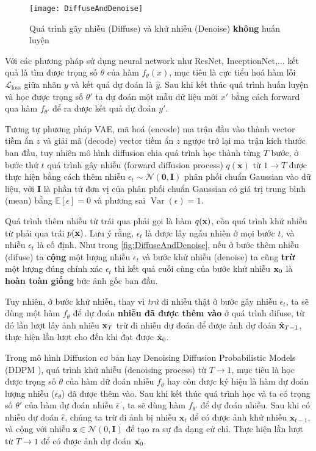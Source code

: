 \begin{figure}[H]
	\centering
	\texttt{[image: DiffuseAndDenoise]}
	\caption{Quá trình gây nhiễu (Diffuse) và khử nhiễu (Denoise) \textbf{không} huấn luyện}
	\label{fig:DiffuseAndDenoise}
\end{figure}

Với các phương pháp sử dụng neural network như ResNet, InceptionNet,... kết quả là tìm được trọng số $\theta$ của hàm $f_{\theta}(x)$, mục tiêu là cực tiểu hoá hàm lỗi $\mathcal{L}_\text{loss}$ giữa nhãn $y$ và kết quả dự đoán là $\hat{y}$. Sau khi kết thúc quá trình huấn luyện và học được trọng số $\theta'$ ta dự đoán một mẫu dữ liệu mới $x'$ bằng cách forward qua hàm $f_{\theta'}$ để ra được kết quả dự đoán $y'$.

Tương tự phương pháp VAE, mã hoá (encode) ma trận đầu vào thành vector tiềm ẩn $z$ và giải mã (decode) vector tiềm ẩn $z$ ngược trở lại ma trận kích thước ban đầu, tuy nhiên mô hình diffusion chia quá trình học thành từng $T$ bước, ở bước thứ $t$ quá trình gây nhiễu (forward diffusion process) $q(\mathbf{x})$ từ $1 \to T$ được thực hiện bằng cách thêm nhiễu $\epsilon_{t} \sim \mathcal{N} (\mathbf{0}, \mathbf{I})$ phân phối chuẩn Gaussian vào dữ liệu, với $\mathbf{I}$ là phần tử đơn vị của phân phối chuẩn Gaussian có giá trị trung bình  (mean) bằng $\mathbb{E}[\epsilon]=0$ và phương sai $\operatorname{Var}(\epsilon)=1$.


Quá trình thêm nhiễu từ trái qua phải gọi là hàm $q(\mathbf{x})$, còn quá trình khử nhiễu từ phải qua trái $p(\mathbf{x})$. Lưu ý rằng, $\epsilon_t$ là được lấy ngẫu nhiên ở mọi bước $t$, và nhiễu $\epsilon_t$ là cố định. Như trong \autoref{fig:DiffuseAndDenoise}, nếu ở bước thêm nhiễu (difuse) ta \textbf{cộng} một lượng nhiễu $\epsilon_t$ và bước khử nhiễu (denoise) ta cũng \textbf{trừ} một lượng đúng chính xác $\epsilon_t$ thì kết quả cuối cùng của bước khử nhiễu $\mathbf{x}_0$ là \textbf{hoàn toàn giống} bức ảnh gốc ban đầu.

Tuy nhiên, ở bước khử nhiễu, thay vì \textit{trừ} đi nhiễu thật ở bước gây nhiễu $\epsilon_t$, ta sẽ dùng một hàm $f_{\theta}$ để dự đoán \textbf{nhiễu đã được thêm vào} ở quá trình difuse, từ đó lần lượt lấy ảnh nhiễu $\mathbf{x}_T$ trừ đi nhiễu dự đoán để được ảnh dự đoán $\hat{\mathbf{x}}_{T-1}$, thực hiện lần lượt cho đến khi đạt được $\hat{\mathbf{x}}_0$.

Trong mô hình Diffusion cơ bản hay Denoising Diffusion Probabilistic Models (DDPM \cite{ho2020denoising}), quá trình khử nhiễu (denoising process) từ $T \to 1$, mục tiêu là học được trọng số $\theta$ của hàm dữ đoán nhiễu $f_{\theta}$ hay còn được ký hiệu là hàm dự đoán lượng nhiễu ($\epsilon_\theta$) đã được thêm vào. Sau khi kết thúc quá trình học và ta có trọng số $\theta'$ của hàm dự đoán nhiễu $\hat{\epsilon}$ , ta sẽ dùng hàm $f_{\theta'}$ để dự đoán nhiễu. Sau khi có nhiễu dự đoán $\hat{\epsilon}$, chúng ta trừ đi ảnh bị nhiễu $\mathbf{x}_{t}$ để có được ảnh khử nhiễu $\mathbf{x}_{t-1}$, và cộng với nhiễu $ \mathbf{z} \in \mathcal{N}(0, \mathbf{I})$ để tạo ra sự đa dạng cử chỉ. Thực hiện lần lượt từ $T \to 1$ để có được ảnh dự đoán $\hat{\mathbf{x}_0}$.

